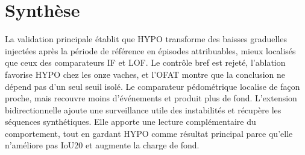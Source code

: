 \section{Synthèse}

La validation principale établit que HYPO transforme des baisses graduelles injectées après
la période de référence en épisodes attribuables, mieux localisés que ceux des comparateurs IF
et LOF. Le contrôle bref est rejeté, l'ablation favorise HYPO chez les onze vaches, et l'OFAT
montre que la conclusion ne dépend pas d'un seul seuil isolé. Le comparateur pédométrique
localise de façon proche, mais recouvre moins d'événements et produit plus de fond.
L'extension bidirectionnelle ajoute une surveillance utile des instabilités et récupère les
séquences synthétiques. Elle apporte une lecture complémentaire du comportement, tout en
gardant HYPO comme résultat principal parce qu'elle n'améliore pas IoU20 et augmente la
charge de fond.
